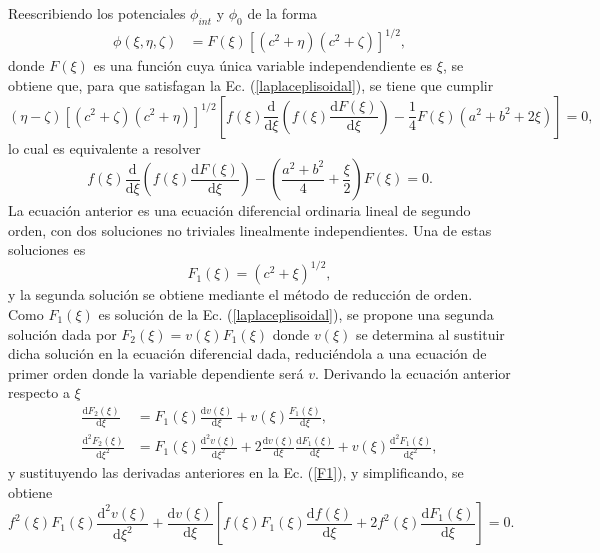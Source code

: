Reescribiendo los potenciales $\phi_{int}$ y $\phi_0$ de la forma
\begin{align}
    \phi(\xi,\eta,\zeta)&=F(\xi)[(c^2+\eta)(c^2+\zeta)]^{1/2}, 
    \label{phi0 con F}
\end{align}
donde $F(\xi)$ es una función cuya única variable independendiente es $\xi$, se obtiene que, para que satisfagan la Ec. (\ref{laplaceplisoidal}), se tiene que cumplir 
\begin{equation}
  (\eta-\zeta)[(c^2+\zeta)(c^2+\eta)]^{1/2}\left[f(\xi)\frac{\text{d}}{\text{d}\xi}\left(f(\xi)\frac{ \text{d} F(\xi)}{\text{d}\xi}\right)-\frac{1}{4}F(\xi)(a^2+b^2+2\xi)\right]=0,
\end{equation}
lo cual es equivalente a resolver
\begin{equation}
    f(\xi)\frac{\text{d}}{\text{d}\xi}\left(f(\xi)\frac{ \text{d} F(\xi)}{\text{d}\xi}\right)-\left(\frac{a^2+b^2}{4}+\frac{\xi}{2}\right)F(\xi)=0.
    \label{ecsimpli}
\end{equation}
La ecuación anterior es una ecuación diferencial ordinaria lineal de segundo orden, con dos soluciones no triviales linealmente independientes. Una de estas soluciones es
\begin{equation}
    F_1(\xi)=(c^2+\xi)^{1/2},
    \label{F1}
\end{equation}
y la segunda solución se obtiene mediante el método de reducción de orden. Como $F_1(\xi)$ es solución de la Ec. (\ref{laplaceplisoidal}), se propone una segunda solución dada por $F_2(\xi)=v(\xi)F_1(\xi)$ donde $v(\xi)$ se determina al sustituir dicha solución en la ecuación diferencial dada, reduciéndola a una ecuación de primer orden donde la variable dependiente será $v$. Derivando la ecuación anterior respecto a $\xi$
\begin{align*}
    \frac{\text{d}F_2(\xi)}{\text{d}\xi}&=F_1(\xi)\frac{\text{d}v(\xi)}{\text{d}\xi}+v(\xi)\frac{F_1(\xi)}{\text{d}\xi},\\
    \frac{\text{d}^2F_2(\xi)}{\text{d}\xi^2}&=F_1(\xi)\frac{\text{d}^2v(\xi)}{\text{d}\xi^2}+2\frac{\text{d}v(\xi)}{\text{d}\xi}\frac{\text{d}F_1(\xi)}{\text{d}\xi}+v(\xi)\frac{\text{d}^2F_1(\xi)}{\text{d}\xi^2},
\end{align*}
y sustituyendo las derivadas anteriores en la Ec. (\ref{F1}), y simplificando, se obtiene
\begin{equation*}
    f^2(\xi)F_1(\xi)\frac{\text{d}^2v(\xi)}{\text{d}\xi^2}+\frac{\text{d}v(\xi)}{\text{d}\xi}\left[f(\xi)F_1(\xi)\frac{\text{d}f(\xi)}{\text{d}\xi}+2f^2(\xi)\frac{\text{d}F_1(\xi)}{\text{d}\xi}\right]=0.
\end{equation*}
